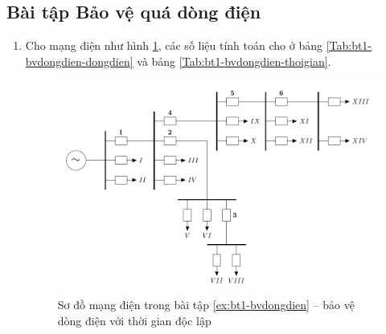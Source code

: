 \documentclass[12pt,a4paper]{article}
\begin{document}
\subsection{Bài tập Bảo vệ quá dòng điện}
	\begin{enumerate}[1.]
		\item \label{ex:bt1-bvdongdien} Cho mạng điện như hình \ref{Fig:bt1-bvdongdien}, các số liệu tính toán cho ở bảng \ref{Tab:bt1-bvdongdien-dongdien} và bảng \ref{Tab:bt1-bvdongdien-thoigian}.					

			\begin{figure}[!h]
				\vspace{-.5cm}
				\begin{center}
					\includegraphics[scale=1]{diagram-draw-tikz/Figure-baitap-baovedongdien-bt1.pdf} 				
				\end{center}
				\vspace{-1cm}
				\caption{Sơ đồ mạng điện trong bài tập \ref{ex:bt1-bvdongdien} -- bảo vệ dòng điện với thời gian độc lập} \label{Fig:bt1-bvdongdien}
			\end{figure}		
			

\end{enumerate}
\end{document}

